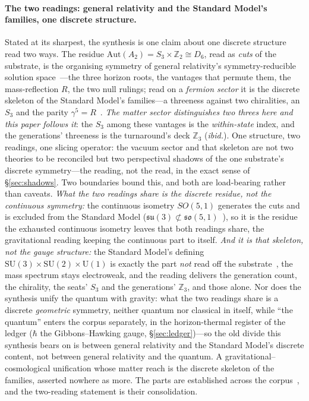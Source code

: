 \documentclass[11pt,a4paper]{article}
\theoremstyle{definition}
\begin{document}
\paragraph{The two readings: general relativity and the Standard Model's families, one discrete structure.} Stated at its sharpest, the synthesis is one claim about one discrete structure read two ways. The residue $\mathrm{Aut}(A_2)=S_3\times\mathbb{Z}_2\cong D_6$, read as \emph{cuts} of the substrate, is the organising symmetry of general relativity's symmetry-reducible solution space~\cite{JanzenRange}---the three horizon roots, the vantages that permute them, the mass-reflection $R$, the two null rulings; read on a \emph{fermion sector} it is the discrete skeleton of the Standard Model's families---a threeness against two chiralities, an $S_3$ and the parity $\gamma^5=R$~\cite{JanzenMatter}. \emph{The matter sector distinguishes two threes here and this paper follows it}: the $S_3$ among these vantages is the \emph{within-state} index, and the generations' threeness is the turnaround's deck $\mathbb{Z}_3$ (\emph{ibid.}). One structure, two readings, one slicing operator: the vacuum sector and that skeleton are not two theories to be reconciled but two perspectival shadows of the one substrate's discrete symmetry---the reading, not the read, in the exact sense of \S\ref{sec:shadows}. Two boundaries bound this, and both are load-bearing rather than caveats. \emph{What the two readings share is the discrete residue, not the continuous symmetry:} the continuous isometry $SO(5,1)$ generates the cuts and is excluded from the Standard Model ($\mathfrak{su}(3)\not\subset\mathfrak{so}(5,1)$~\cite{JanzenBoundary}), so it is the residue the exhausted continuous isometry leaves that both readings share, the gravitational reading keeping the continuous part to itself. \emph{And it is that skeleton, not the gauge structure:} the Standard Model's defining $\mathrm{SU}(3)\times\mathrm{SU}(2)\times\mathrm{U}(1)$ is exactly the part \emph{not} read off the substrate~\cite{JanzenBoundary}, the mass spectrum stays electroweak, and the reading delivers the generation count, the chirality, the seats' $S_3$ and the generations' $\mathbb{Z}_3$, and those alone. Nor does the synthesis unify the quantum with gravity: what the two readings share is a discrete \emph{geometric} symmetry, neither quantum nor classical in itself, while ``the quantum'' enters the corpus separately, in the horizon-thermal register of the ledger ($\hbar$ the Gibbons--Hawking gauge, \S\ref{sec:ledger})---so the old divide this synthesis bears on is between general relativity and the Standard Model's discrete content, not between general relativity and the quantum. A gravitational--cosmological unification whose matter reach is the discrete skeleton of the families, asserted nowhere as more. The parts are established across the corpus~\cite{JanzenSlicing,JanzenGroupoid,JanzenOperator,JanzenDynamics}, and the two-reading statement is their consolidation.
\end{document}
